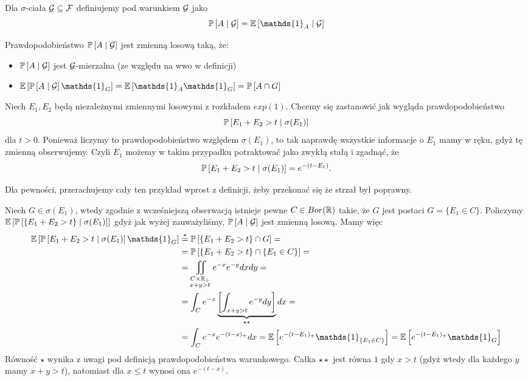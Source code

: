 \begin{definition}\label{prawdopodobienstwo warunkowe}
  Dla $\sigma$-ciała $\mathcal{G}\subseteq\mathcal{F}$ definiujemy  pod warunkiem $\mathcal{G}$ jako
  $$\prob{A}{\set{G}}=\expected{\mathds{1}_A}{\set{G}}$$
\end{definition}

Prawdopodobieństwo $\prob{A}{\set{G}}$ jest zmienną losową taką, że:
\begin{itemize}
  \item $\prob{A}{\set{G}}$ jest $\mathcal{G}$-mierzalna (ze względu na wwo w definicji)
  \item $\expected{\prob{A}{\set{G}}\mathds{1}_G}=\expected{\mathds{1}_A\mathds{1}_G}=\prob{A\cap G}$
\end{itemize}

\begin{example}
\item Niech $E_1,E_2$ będą niezależnymi zmiennymi losowymi z rozkładem $exp(1)$. Chcemy się zastanowić jak wygląda prawdopodobieństwo
  $$\prob{E_1+E_2>t}{\sigma(E_1)}$$
  dla $t>0$. Ponieważ liczymy to prawdopodobieństwo względem $\sigma(E_1)$, to tak naprawdę wszystkie informacje o $E_1$ mamy w ręku, gdyż tę zmienną obserwujemy. Czyli $E_1$ możemy w takim przypadku potraktować jako zwykłą stałą i zgadnąć, że
  $$\prob{E_1+E_2>t}{\sigma(E_1)}=e^{-(t-E_1)}.$$

  Dla pewności, przerachujemy cały ten przykład wprost z definicji, żeby przekonać się że strzał był poprawny.

  Niech $G\in\sigma(E_1)$, wtedy zgodnie z wcześniejszą obserwacją istnieje pewne $C\in Bor(\operatorname{\mathbb{R}})$ takie, że $G$ jest postaci $G=\{E_1\in C\}$. Policzymy $\expected{\prob{\{E_1+E_2>t\}}{\sigma(E_1)}}$ gdyż jak wyżej zauważyliśmy, $\prob{A}{\set{G}}$ jest zmienną losową. Mamy więc
  \begin{align*}
    \expected{\prob{E_1+E_2>t}{\sigma(E_1)}\mathds{1}_G}&\overset{\star}{=}\prob{\{E_1+E_2>t\}\cap G}=\\
                                                        &=\prob{\{E_1+E_2>t\}\cap\{E_1\in C\}}=\\
                                                        &=\iint\limits_{\substack{C\times\R_+\\x+y>t}}e^{-x}e^{-y}dxdy=\\
                                                        &=\int_Ce^{-x}\underbrace{\left[\int_{x+y>t}e^{-y}dy\right]}_{\star\star}dx=\\
                                                        &=\int_Ce^{-x}e^{-(t-x)_+}dx=\expected{e^{-(t-E_1)_+}\mathds{1}_{\{E_1\in C\}}}=\expected{e^{-(t-E_1)_+}\mathds{1}_G}
  \end{align*}
  Równość $\star$ wynika z uwagi pod definicją prawdopodobieństwa warunkowego. Całka $\star\star$ jest równa $1$ gdy $x>t$ (gdyż wtedy dla każdego $y$ mamy $x+y>t$), natomiast dla $x\leq t$ wynosi ona $e^{-(t-x)}$.
\end{example}
